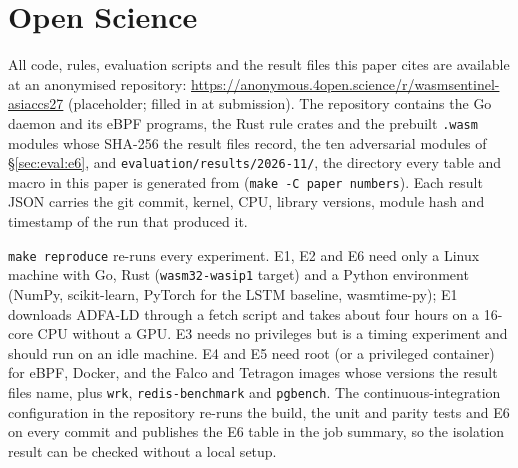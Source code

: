 \section{Open Science}
\label{sec:openscience}

All code, rules, evaluation scripts and the result files this paper cites
are available at an anonymised repository:
\url{https://anonymous.4open.science/r/wasmsentinel-asiaccs27}
(placeholder; filled in at submission). The repository contains the Go
daemon and its eBPF programs, the Rust rule crates and the prebuilt
\texttt{.wasm} modules whose SHA-256 the result files record, the ten
adversarial modules of \S\ref{sec:eval:e6}, and
\texttt{evaluation/results/2026-11/}, the directory every table and macro in
this paper is generated from (\texttt{make -C paper numbers}). Each result
JSON carries the git commit, kernel, CPU, library versions, module hash and
timestamp of the run that produced it.

\texttt{make reproduce} re-runs every experiment. E1, E2 and E6 need only a
Linux machine with Go, Rust (\texttt{wasm32-wasip1} target) and a Python
environment (NumPy, scikit-learn, PyTorch for the LSTM baseline,
wasmtime-py); E1 downloads ADFA-LD through a fetch script and takes about
four hours on a 16-core CPU without a GPU. E3 needs no privileges but is a
timing experiment and should run on an idle machine. E4 and E5 need root
(or a privileged container) for eBPF, Docker, and the Falco and Tetragon
images whose versions the result files name, plus \texttt{wrk},
\texttt{redis-benchmark} and \texttt{pgbench}. The continuous-integration
configuration in the repository re-runs the build, the unit and parity
tests and E6 on every commit and publishes the E6 table in the job summary,
so the isolation result can be checked without a local setup.
